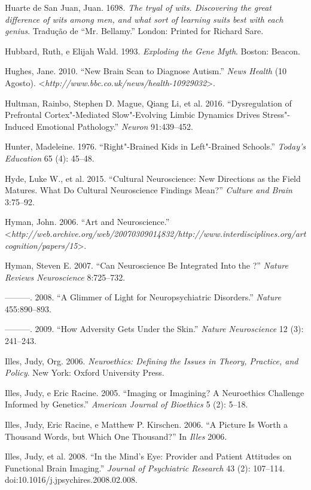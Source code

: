 Huarte de San Juan, Juan. 1698. \emph{The tryal of wits. Discovering the
great difference of wits among men, and what sort of learning suits best
with each genius}. Tradução de ``Mr. Bellamy.'' London: Printed for
Richard Sare.

Hubbard, Ruth, e Elijah Wald. 1993. \emph{Exploding the Gene Myth}.
Boston: Beacon.

Hughes, Jane. 2010. ``New Brain Scan to Diagnose Autism.'' \emph{
News Health} (10 Agosto).
\textless{}\emph{http://www.bbc.co.uk/news/health-10929032}\textgreater{}.

Hultman, Rainbo, Stephen D. Mague, Qiang Li, et al. 2016.
``Dysregulation of Prefrontal Cortex"-Mediated Slow"-Evolving Limbic
Dynamics Drives Stress"-Induced Emotional Pathology.'' \emph{Neuron}
91:439--452.

Hunter, Madeleine. 1976. ``Right"-Brained Kids in Left"-Brained Schools.''
\emph{Today's Education} 65 (4): 45--48.

Hyde, Luke W., et al. 2015. ``Cultural Neuroscience: New Directions as
the Field Matures. What Do Cultural Neuroscience Findings Mean?''
\emph{Culture and Brain} 3:75--92.

Hyman, John. 2006. ``Art and Neuroscience.''
\textless{}\emph{http://web.archive.org/web/20070309014832/http://www.interdisciplines.org/artcognition/papers/15}\textgreater{}.

Hyman, Steven E. 2007. ``Can Neuroscience Be Integrated Into the ?''
\emph{Nature Reviews Neuroscience} 8:725--732.

---------. 2008. ``A Glimmer of Light for Neuropsychiatric Disorders.''
\emph{Nature} 455:890--893.

---------. 2009. ``How Adversity Gets Under the Skin.'' \emph{Nature
Neuroscience} 12 (3): 241--243.

Illes, Judy, Org. 2006. \emph{Neuroethics: Defining the Issues in
Theory, Practice, and Policy}. New York: Oxford University Press.

Illes, Judy, e Eric Racine. 2005. ``Imaging or Imagining? A Neuroethics
Challenge Informed by Genetics.'' \emph{American Journal of Bioethics} 5
(2): 5--18.

Illes, Judy, Eric Racine, e Matthew P. Kirschen. 2006. ``A Picture Is
Worth a Thousand Words, but Which One Thousand?'' In \emph{Illes} 2006.

Illes, Judy, et al. 2008. ``In the Mind's Eye: Provider and Patient
Attitudes on Functional Brain Imaging.'' \emph{Journal of Psychiatric
Research} 43 (2): 107--114. doi:10.1016/j.jpsychires.2008.02.008.


